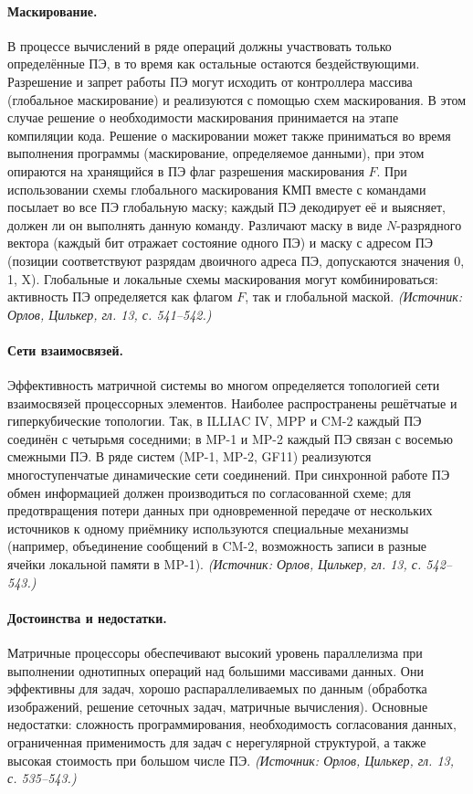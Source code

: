 \documentclass[a4paper,12pt]{article}
\begin{document}
\paragraph{Маскирование.}
В процессе вычислений в ряде операций должны участвовать только определённые ПЭ, в то время как остальные остаются бездействующими. Разрешение и запрет работы ПЭ могут исходить от контроллера массива (глобальное маскирование) и реализуются с помощью схем маскирования. В этом случае решение о необходимости маскирования принимается на этапе компиляции кода. Решение о маскировании может также приниматься во время выполнения программы (маскирование, определяемое данными), при этом опираются на хранящийся в ПЭ флаг разрешения маскирования \(F\). При использовании схемы глобального маскирования КМП вместе с командами посылает во все ПЭ глобальную маску; каждый ПЭ декодирует её и выясняет, должен ли он выполнять данную команду. Различают маску в виде \(N\)-разрядного вектора (каждый бит отражает состояние одного ПЭ) и маску с адресом ПЭ (позиции соответствуют разрядам двоичного адреса ПЭ, допускаются значения 0, 1, X). Глобальные и локальные схемы маскирования могут комбинироваться: активность ПЭ определяется как флагом \(F\), так и глобальной маской.
\textit{(Источник: Орлов, Цилькер, гл. 13, с. 541--542.)}

\paragraph{Сети взаимосвязей.}
Эффективность матричной системы во многом определяется топологией сети взаимосвязей процессорных элементов. Наиболее распространены решётчатые и гиперкубические топологии. Так, в ILLIAC IV, MPP и CM-2 каждый ПЭ соединён с четырьмя соседними; в MP-1 и MP-2 каждый ПЭ связан с восемью смежными ПЭ. В ряде систем (MP-1, MP-2, GF11) реализуются многоступенчатые динамические сети соединений. При синхронной работе ПЭ обмен информацией должен производиться по согласованной схеме; для предотвращения потери данных при одновременной передаче от нескольких источников к одному приёмнику используются специальные механизмы (например, объединение сообщений в CM-2, возможность записи в разные ячейки локальной памяти в MP-1).
\textit{(Источник: Орлов, Цилькер, гл. 13, с. 542--543.)}

\paragraph{Достоинства и недостатки.}
Матричные процессоры обеспечивают высокий уровень параллелизма при выполнении однотипных операций над большими массивами данных. Они эффективны для задач, хорошо распараллеливаемых по данным (обработка изображений, решение сеточных задач, матричные вычисления). Основные недостатки: сложность программирования, необходимость согласования данных, ограниченная применимость для задач с нерегулярной структурой, а также высокая стоимость при большом числе ПЭ.
\textit{(Источник: Орлов, Цилькер, гл. 13, с. 535--543.)}
\end{document}
